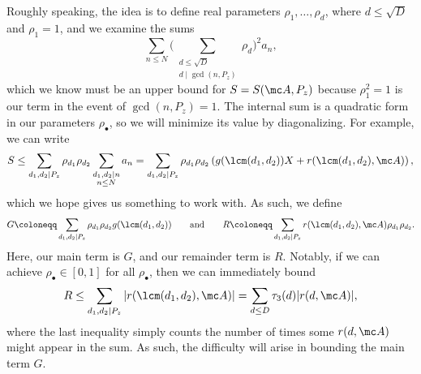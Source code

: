 \documentclass[../notes.tex]{subfiles}
\begin{document}
Roughly speaking, the idea is to define real parameters $\rho_1,\ldots,\rho_d$, where $d\le\sqrt D$ and $\rho_1=1$, and we examine the sums
\[\sum_{n\le N}\Bigg(\sum_{\substack{d\le\sqrt D\\d\mid\gcd(n,P_z)}}\rho_d\Bigg)^2a_n,\]
which we know must be an upper bound for $S=S(\mc A,P_z)$ because $\rho_1^2=1$ is our term in the event of $\gcd(n,P_z)=1$. The internal sum is a quadratic form in our parameters $\rho_\bullet$, so we will minimize its value by diagonalizing. For example, we can write
\[S\le\sum_{d_1,d_2\mid P_z}\rho_{d_1}\rho_{d_2}\sum_{\substack{d_1,d_2\mid n\\n\le N}}a_n=\sum_{d_1,d_2\mid P_z}\rho_{d_1}\rho_{d_2}\left(g(\lcm(d_1,d_2))X+r(\lcm(d_1,d_2),\mc A)\right),\]
which we hope gives us something to work with. As such, we define
\[G\coloneqq\sum_{d_1,d_2\mid P_z}\rho_{d_1}\rho_{d_2}g(\lcm(d_1,d_2))\qquad\text{and}\qquad R\coloneqq\sum_{d_1,d_2\mid P_z}r(\lcm(d_1,d_2),\mc A)\rho_{d_1}\rho_{d_2}.\]
Here, our main term is $G$, and our remainder term is $R$. Notably, if we can achieve $\rho_\bullet\in[0,1]$ for all $\rho_\bullet$, then we can immediately bound
\[R\le\sum_{d_1,d_2\mid P_z}|r(\lcm(d_1,d_2),\mc A)|=\sum_{d\le D}\tau_3(d)|r(d,\mc A)|,\]
where the last inequality simply counts the number of times some $r(d,\mc A)$ might appear in the sum. As such, the difficulty will arise in bounding the main term $G$.
\end{document}
